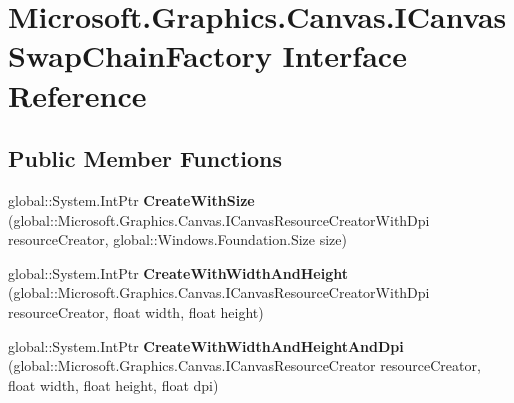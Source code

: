 \hypertarget{interface_microsoft_1_1_graphics_1_1_canvas_1_1_i_canvas_swap_chain_factory}{}\section{Microsoft.\+Graphics.\+Canvas.\+I\+Canvas\+Swap\+Chain\+Factory Interface Reference}
\label{interface_microsoft_1_1_graphics_1_1_canvas_1_1_i_canvas_swap_chain_factory}
\subsection*{Public Member Functions}
\begin{DoxyCompactItemize}
\item 
\mbox{\label{interface_microsoft_1_1_graphics_1_1_canvas_1_1_i_canvas_swap_chain_factory_a80f024e2b5c57fefb1507afbe4bd54cc}} 
global\+::\+System.\+Int\+Ptr {\bfseries Create\+With\+Size} (global\+::\+Microsoft.\+Graphics.\+Canvas.\+I\+Canvas\+Resource\+Creator\+With\+Dpi resource\+Creator, global\+::\+Windows.\+Foundation.\+Size size)
\item 
\mbox{\label{interface_microsoft_1_1_graphics_1_1_canvas_1_1_i_canvas_swap_chain_factory_a2adbd2e8ccc7fda2470b0e91e8d58ca7}} 
global\+::\+System.\+Int\+Ptr {\bfseries Create\+With\+Width\+And\+Height} (global\+::\+Microsoft.\+Graphics.\+Canvas.\+I\+Canvas\+Resource\+Creator\+With\+Dpi resource\+Creator, float width, float height)
\item 
\mbox{\label{interface_microsoft_1_1_graphics_1_1_canvas_1_1_i_canvas_swap_chain_factory_abec837948f196cc09791ba957885b690}} 
global\+::\+System.\+Int\+Ptr {\bfseries Create\+With\+Width\+And\+Height\+And\+Dpi} (global\+::\+Microsoft.\+Graphics.\+Canvas.\+I\+Canvas\+Resource\+Creator resource\+Creator, float width, float height, float dpi)
\item 
\mbox{\label{interface_microsoft_1_1_graphics_1_1_canvas_1_1_i_canvas_swap_chain_factory_ab3ef9c019b3b37be03ba50236075ba58}} 

\end{DoxyCompactItemize}

